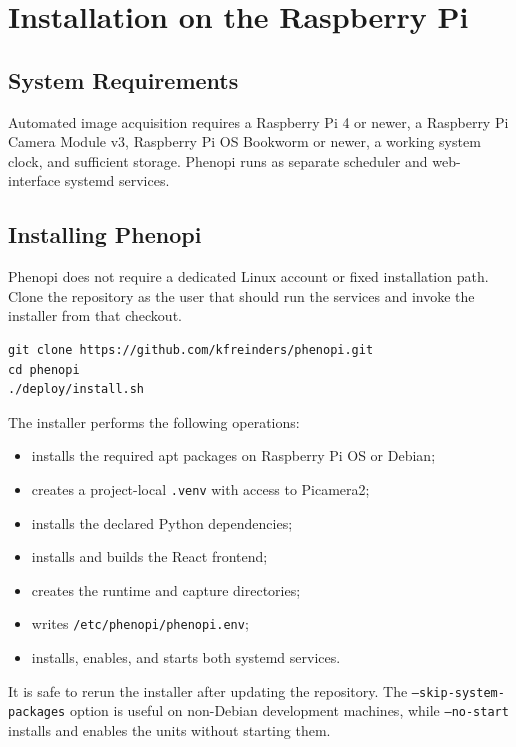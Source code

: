 \section{Installation on the Raspberry Pi}

\subsection{System Requirements}

Automated image acquisition requires a Raspberry Pi 4 or newer, a Raspberry Pi
Camera Module v3, Raspberry Pi OS Bookworm or newer, a working system clock,
and sufficient storage. Phenopi runs as separate scheduler and web-interface
systemd services.

\subsection{Installing Phenopi}

Phenopi does not require a dedicated Linux account or fixed installation path.
Clone the repository as the user that should run the services and invoke the
installer from that checkout.

\begin{verbatim}
git clone https://github.com/kfreinders/phenopi.git
cd phenopi
./deploy/install.sh
\end{verbatim}

The installer performs the following operations:

\begin{itemize}
  \item installs the required apt packages on Raspberry Pi OS or Debian;
  \item creates a project-local \texttt{.venv} with access to Picamera2;
  \item installs the declared Python dependencies;
  \item installs and builds the React frontend;
  \item creates the runtime and capture directories;
  \item writes \texttt{/etc/phenopi/phenopi.env};
  \item installs, enables, and starts both systemd services.
\end{itemize}

It is safe to rerun the installer after updating the repository. The
\texttt{--skip-system-packages} option is useful on non-Debian development
machines, while \texttt{--no-start} installs and enables the units without
starting them.


